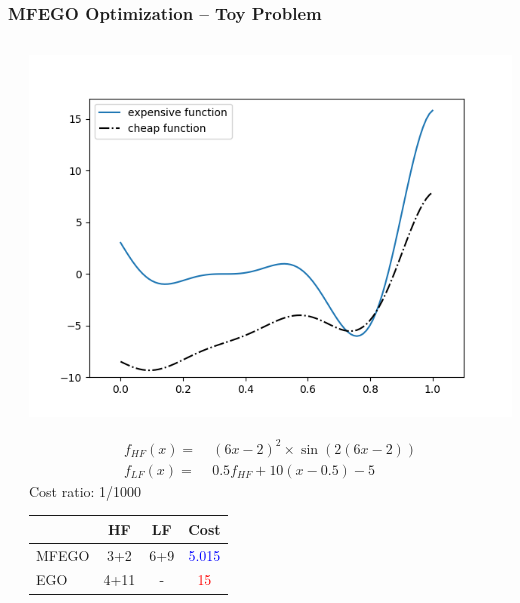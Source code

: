 \documentclass{beamer}
\theoremstyle{remark}
\theoremstyle{plain}
\begin{document}
\begin{frame}[fragile]
  \frametitle{MFEGO Optimization -- Toy Problem}
  \begin{columns}
  
  \begin{column}{0.65\linewidth}
  \begin{center}
 	\end{center}
  \end{column}
  \begin{column}{0.35\linewidth}
  \begin{center}
  \includegraphics[width=\textwidth]{Bayesian/testcase}
  \end{center}
  \tiny
  \begin{align*}
f_{HF}(x) =&\;(6  x -2)^2 \times \sin(2(6 x - 2))\\
f_{LF}(x) =&\;0.5 f_{HF} + 10 (x-0.5) - 5
\end{align*}
Cost ratio: 1/1000
 \begin{tabular} {  l  c  c  c }
 \hline
 & HF & LF & Cost \\
 \hline
 \hline
 MFEGO  & \textcolor{green!40!black}{3}+2  & \textcolor{green!40!black}{6}+9 & \textcolor{blue}{5.015}\\
  EGO  & \textcolor{green!40!black}{4}+11  & - & \textcolor{red}{15}\\
\hline
\end{tabular} 
  \end{column}
  \end{columns}
\end{frame}
    
\end{document}
